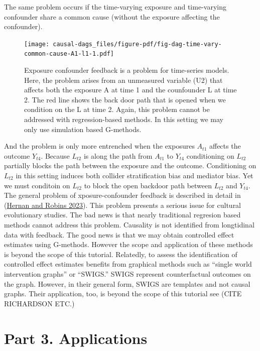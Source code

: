 \documentclass[
  singlecolumn]{report}
\begin{document}
The same problem occurs if the time-varying exposure and time-varying
confounder share a common cause (without the exposure affecting the
confounder).

\begin{figure}

{\centering \texttt{[image: causal-dags\_files/figure-pdf/fig-dag-time-vary-common-cause-A1-l1-1.pdf]}

}

\caption{\label{fig-dag-time-vary-common-cause-A1-l1}Exposure confounder
feedback is a problem for time-series models. Here, the problem arises
from an unmeasured variable (U2) that affects both the exposure A at
time 1 and the counfounder L at time 2. The red line shows the back door
path that is opened when we condition on the L at time 2. Again, this
problem cannot be addressed with regression-based methods. In this
setting we may only use simulation based G-methods.}

\end{figure}

And the problem is only more entrenched when the exposures \(A_{t1}\)
affects the outcome \(Y_{t4}\). Because \(L_{t2}\) is along the path
from \(A_{t1}\) to \(Y_{t4}\) conditioning on \(L_{t2}\) partially
blocks the path between the exposure and the outcome. Conditioning on
\(L_{t2}\) in this setting induces both collider stratification bias and
mediator bias. Yet we must conditoin on \(L_{t2}\) to block the open
backdoor path between \(L_{t2}\) and \(Y_{t4}\). The general problem of
xposure-confounder feedback is described in detail in
(\protect\hyperlink{ref-hernan2023}{Hernan and Robins 2023}). This
problem presents a serious issue for cultural evolutionary studies. The
bad news is that nearly traditional regresion based methods cannot
address this problem. Causality is not identified from longtidinal data
with feedback. The good news is that we may obtain controlled effect
estimates using G-methods. However the scope and application of these
methods is beyond the scope of this tutorial. Relatedly, to assess the
identification of controlled effect estimates benefits from graphical
methods such as ``single world intervention graphs'' or ``SWIGS.'' SWIGS
represent counterfactual outcomes on the graph. However, in their
general form, SWIGS are templates and not causal graphs. Their
application, too, is beyond the scope of this tutorial see (CITE
RICHARDSON ETC.)

\hypertarget{part-3.-applications}{%
\section{Part 3. Applications}\label{part-3.-applications}}
\end{document}
